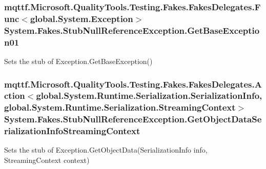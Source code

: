 \hypertarget{class_system_1_1_fakes_1_1_stub_null_reference_exception_aa4a76f089121eb7bf8ceae99e423e87a}{
\subsubsection[{Get\-Base\-Exception01}]{\setlength{\rightskip}{0pt plus 5cm}mqttf.\-Microsoft.\-Quality\-Tools.\-Testing.\-Fakes.\-Fakes\-Delegates.\-Func$<$global.\-System.\-Exception$>$ System.\-Fakes.\-Stub\-Null\-Reference\-Exception.\-Get\-Base\-Exception01}}\label{class_system_1_1_fakes_1_1_stub_null_reference_exception_aa4a76f089121eb7bf8ceae99e423e87a}


Sets the stub of Exception.\-Get\-Base\-Exception()

\hypertarget{class_system_1_1_fakes_1_1_stub_null_reference_exception_a51b9137f16e3e6e4a47bf0360576c23e}{
\subsubsection[{Get\-Object\-Data\-Serialization\-Info\-Streaming\-Context}]{\setlength{\rightskip}{0pt plus 5cm}mqttf.\-Microsoft.\-Quality\-Tools.\-Testing.\-Fakes.\-Fakes\-Delegates.\-Action$<$global.\-System.\-Runtime.\-Serialization.\-Serialization\-Info, global.\-System.\-Runtime.\-Serialization.\-Streaming\-Context$>$ System.\-Fakes.\-Stub\-Null\-Reference\-Exception.\-Get\-Object\-Data\-Serialization\-Info\-Streaming\-Context}}\label{class_system_1_1_fakes_1_1_stub_null_reference_exception_a51b9137f16e3e6e4a47bf0360576c23e}


Sets the stub of Exception.\-Get\-Object\-Data(\-Serialization\-Info info, Streaming\-Context context)

